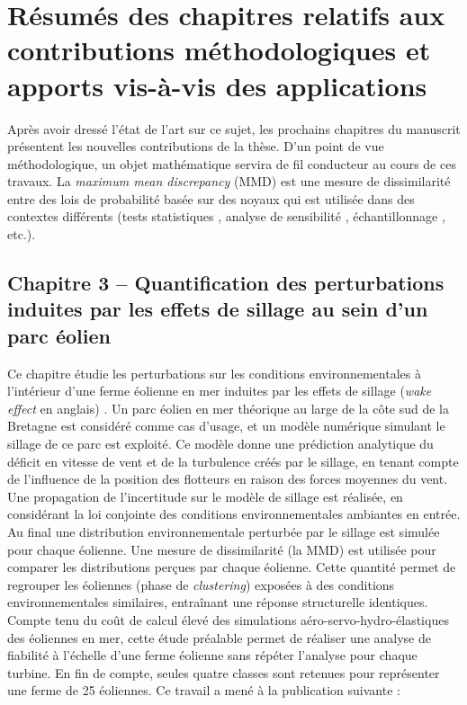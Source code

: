 \section{Résumés des chapitres relatifs aux contributions méthodologiques et apports vis-à-vis des applications}

Après avoir dressé l'état de l'art sur ce sujet, les prochains chapitres du manuscrit présentent les nouvelles contributions de la thèse. 
D'un point de vue méthodologique, un objet mathématique servira de fil conducteur au cours de ces travaux. 
La \textit{maximum mean discrepancy} (MMD) \cite{oates_21} est une mesure de dissimilarité entre des lois de probabilité basée sur des noyaux qui est utilisée dans des contextes différents (tests statistiques \cite{gretton_2006}, analyse de sensibilité \cite{daveiga_2015}, échantillonnage \cite{pronzato_zhigljavsky_2020}, etc.).

\subsection*{Chapitre 3 -- Quantification des perturbations induites par les effets de sillage au sein d'un parc éolien}

Ce chapitre étudie les perturbations sur les conditions environnementales à l'intérieur d'une ferme éolienne en mer induites par les effets de sillage (\textit{wake effect} en anglais) \cite{larsen_2008_wake}. 
Un parc éolien en mer théorique au large de la côte sud de la Bretagne est considéré comme cas d'usage, et un modèle numérique simulant le sillage de ce parc est exploité. 
Ce modèle donne une prédiction analytique du déficit en vitesse de vent et de la turbulence créés par le sillage, en tenant compte de l'influence de la position des flotteurs en raison des forces moyennes du vent. 
Une propagation de l'incertitude sur le modèle de sillage est réalisée, en considérant la loi conjointe des conditions environnementales ambiantes en entrée. 
Au final une distribution environnementale perturbée par le sillage est simulée pour chaque éolienne. 
Une mesure de dissimilarité (la MMD) est utilisée pour comparer les distributions perçues par chaque éolienne. 
Cette quantité permet de regrouper les éoliennes (phase de \textit{clustering}) exposées à des conditions environnementales similaires, entraînant une réponse structurelle identiques. 
Compte tenu du coût de calcul élevé des simulations aéro-servo-hydro-élastiques des éoliennes en mer, cette étude préalable permet de réaliser une analyse de fiabilité à l'échelle d'une ferme éolienne sans répéter l'analyse pour chaque turbine. 
En fin de compte, seules quatre classes sont retenues pour représenter une ferme de 25 éoliennes. 
Ce travail a mené à la publication suivante : \\

